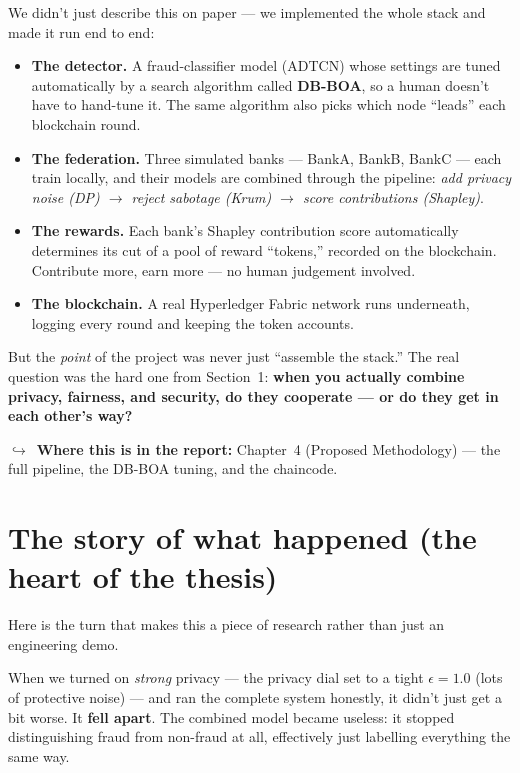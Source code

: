 \documentclass[11pt]{article}
\newcommand{\reportnote}[1]{%
  \par\vspace{3pt}%
  {\small\color{soft}$\hookrightarrow$\ \textbf{Where this is in the report:} #1}\par\vspace{2pt}}
\begin{document}
We didn't just describe this on paper --- we implemented the whole stack and made it run end to end:

\begin{itemize}
  \item \textbf{The detector.} A fraud-classifier model (ADTCN) whose settings are tuned automatically
  by a search algorithm called \textbf{DB-BOA}, so a human doesn't have to hand-tune it. The same
  algorithm also picks which node ``leads'' each blockchain round.
  \item \textbf{The federation.} Three simulated banks --- BankA, BankB, BankC --- each train locally,
  and their models are combined through the pipeline: \emph{add privacy noise (DP) $\rightarrow$ reject
  sabotage (Krum) $\rightarrow$ score contributions (Shapley)}.
  \item \textbf{The rewards.} Each bank's Shapley contribution score automatically determines its cut of
  a pool of reward ``tokens,'' recorded on the blockchain. Contribute more, earn more --- no human
  judgement involved.
  \item \textbf{The blockchain.} A real Hyperledger Fabric network runs underneath, logging every round
  and keeping the token accounts.
\end{itemize}

But the \emph{point} of the project was never just ``assemble the stack.'' The real question was the
hard one from Section~1: \textbf{when you actually combine privacy, fairness, and security, do they
cooperate --- or do they get in each other's way?}

\reportnote{Chapter~4 (Proposed Methodology) --- the full pipeline, the DB-BOA tuning, and the chaincode.}

\section{The story of what happened (the heart of the thesis)}

Here is the turn that makes this a piece of research rather than just an engineering demo.

When we turned on \emph{strong} privacy --- the privacy dial set to a tight $\epsilon = 1.0$ (lots of
protective noise) --- and ran the complete system honestly, it didn't just get a bit worse. It
\textbf{fell apart}. The combined model became useless: it stopped distinguishing fraud from non-fraud
at all, effectively just labelling everything the same way.
\end{document}
